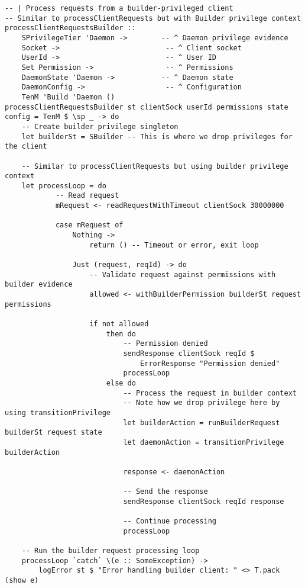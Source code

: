 \documentclass{article}
\begin{document}
\begin{tcolorbox}[title=Ten/Daemon/Server.hs Changes]
\begin{verbatim}
-- | Process requests from a builder-privileged client
-- Similar to processClientRequests but with Builder privilege context
processClientRequestsBuilder ::
    SPrivilegeTier 'Daemon ->        -- ^ Daemon privilege evidence
    Socket ->                         -- ^ Client socket
    UserId ->                         -- ^ User ID
    Set Permission ->                 -- ^ Permissions
    DaemonState 'Daemon ->           -- ^ Daemon state
    DaemonConfig ->                   -- ^ Configuration
    TenM 'Build 'Daemon ()
processClientRequestsBuilder st clientSock userId permissions state config = TenM $ \sp _ -> do
    -- Create builder privilege singleton
    let builderSt = SBuilder -- This is where we drop privileges for the client

    -- Similar to processClientRequests but using builder privilege context
    let processLoop = do
            -- Read request
            mRequest <- readRequestWithTimeout clientSock 30000000

            case mRequest of
                Nothing ->
                    return () -- Timeout or error, exit loop

                Just (request, reqId) -> do
                    -- Validate request against permissions with builder evidence
                    allowed <- withBuilderPermission builderSt request permissions

                    if not allowed
                        then do
                            -- Permission denied
                            sendResponse clientSock reqId $
                                ErrorResponse "Permission denied"
                            processLoop
                        else do
                            -- Process the request in builder context
                            -- Note how we drop privilege here by using transitionPrivilege
                            let builderAction = runBuilderRequest builderSt request state
                            let daemonAction = transitionPrivilege builderAction

                            response <- daemonAction

                            -- Send the response
                            sendResponse clientSock reqId response

                            -- Continue processing
                            processLoop

    -- Run the builder request processing loop
    processLoop `catch` \(e :: SomeException) ->
        logError st $ "Error handling builder client: " <> T.pack (show e)


\end{verbatim}
\end{tcolorbox}
\end{document}
